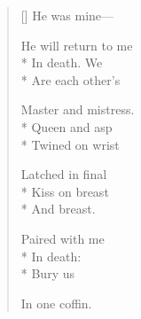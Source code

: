 \label{ch:lear_bn}
\begin{verse}[\versewidth]
 He was mine---

He will return to me\\*
In death. We\\*
Are each other's

Master and mistress.\\*
Queen and asp\\*
Twined on wrist

Latched in final\\*
Kiss on breast\\*
And breast.

Paired with me\\*
In death:\qquad\\*
\hspace*{3\vgap} Bury us

In one coffin.
\end{verse}
